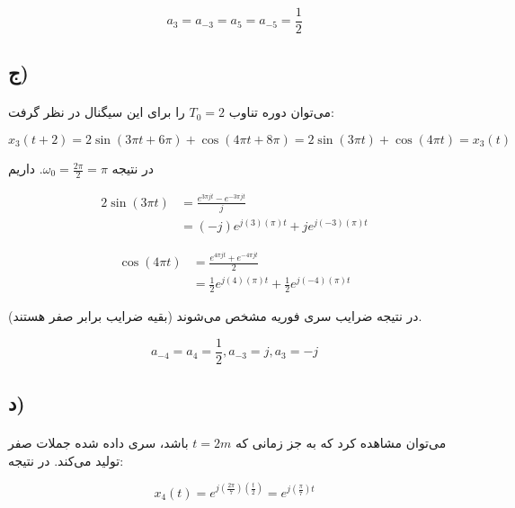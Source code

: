 \documentclass{article}
\begin{document}
	\begin{equation*}
		a_3 = a_{-3} = a_5 = a_{-5} = \frac{1}{2}
	\end{equation*}

	\subsection*{ج)}
	\paragraph*{}
	می‌توان دوره تناوب
	$T_0 = 2$
	را برای این سیگنال در نظر گرفت:

	\begin{equation*}
		x_3(t + 2) = 2\sin(3\pi t + 6\pi) + \cos(4\pi t + 8\pi)
		= 2\sin(3\pi t) + \cos(4\pi t) = x_3(t)
	\end{equation*}

	در نتیجه
	$\omega_0 = \frac{2\pi}{2} = \pi$.
	داریم

	\begin{align*}
		2\sin(3\pi t) &= \frac{e^{3\pi j t} - e^{- 3\pi j t}}{j} \\
		&= (-j)e^{j(3)(\pi)t} + je^{j(-3)(\pi)t}
	\end{align*}

	\begin{align*}
		\cos(4\pi t) &= \frac{e^{4\pi j t} + e^{- 4\pi j t}}{2} \\
		&= \frac{1}{2} e^{j(4)(\pi)t} + \frac{1}{2} e^{j(-4)(\pi)t}
	\end{align*}

	در نتیجه ضرایب سری فوریه مشخص می‌شوند (بقیه ضرایب برابر صفر هستند).

	\begin{equation*}
		a_{-4} = a_4 = \frac{1}{2}, a_{-3} = j, a_3 = -j
	\end{equation*}

	\subsection*{د)}
	\paragraph*{}
	می‌توان مشاهده کرد که به جز زمانی که
	$t = 2m$
	باشد، سری داده شده جملات صفر تولید می‌کند. در نتیجه:

	\begin{equation*}
		x_4(t) = e^{j\left(\frac{2\pi}{7}\right)(\frac{t}{2})}
		= e^{j \left(\frac{\pi}{7}\right)t}
	\end{equation*}
\end{document}
